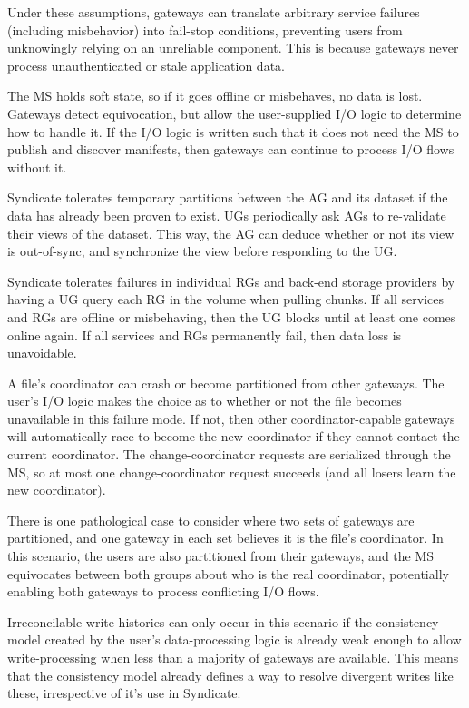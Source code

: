 Under these assumptions, gateways can translate arbitrary service failures
(including misbehavior) into fail-stop conditions, preventing users from
unknowingly relying on an unreliable component.  This is because gateways never
process unauthenticated or stale application data.

The MS holds soft state, so if it goes offline or misbehaves, no data is lost.
Gateways detect equivocation, but allow the
user-supplied I/O logic to determine how to handle it.  If the I/O logic is written such that it does not
need the MS to publish and discover manifests, then gateways can
continue to process I/O flows without it.

Syndicate tolerates temporary partitions between the AG and its dataset
if the data has already been proven to exist. UGs periodically ask AGs
to re-validate their views of the dataset.
This way, the AG can deduce whether or not its view is out-of-sync, and
synchronize the view before responding to the UG.

Syndicate tolerates failures in individual RGs and back-end storage providers by
having a UG query each RG in the volume when pulling chunks.  If all services
and RGs are offline or misbehaving, then the UG blocks until
at least one comes online again. If all services and RGs permanently fail, then data loss is
unavoidable.

A file's coordinator can crash or become partitioned from other gateways.
The user's I/O logic makes the choice as to whether or not the file becomes unavailable
in this failure mode.  If not, then other coordinator-capable gateways will
automatically race to become the new coordinator if they cannot contact
the current coordinator.  The change-coordinator requests are serialized
through the MS, so at most one change-coordinator request succeeds (and all
losers learn the new coordinator).

There is one pathological case to consider where two sets of gateways are
partitioned, and one gateway in each set believes it is the file's coordinator.
In this scenario, the users are also partitioned from their gateways, and the MS
equivocates between both groups about who is the real coordinator, potentially
enabling both gateways to process conflicting I/O flows.

Irreconcilable write histories can only occur in this scenario if the consistency model
created by the user's data-processing logic is already weak enough to allow 
write-processing when less than a majority of gateways are available.
This means that the consistency model already defines a way to resolve divergent
writes like these, irrespective of it's use in Syndicate.

